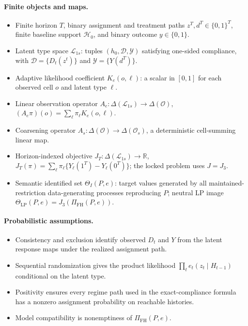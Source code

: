 \documentclass[11pt]{article}
\theoremstyle{definition}
\theoremstyle{plain}
\theoremstyle{remark}
\begin{document}
\paragraph{Finite objects and maps.}
\begin{itemize}[leftmargin=*]
\item Finite horizon \(T\), binary assignment and treatment paths \(z^T,d^T\in\{0,1\}^T\), finite baseline support \(\mathcal H_0\), and binary outcome \(y\in\{0,1\}\).
\item Latent type space \(\mathcal L_{1s}\): tuples \((h_0,\mathcal D,\mathcal Y)\) satisfying one-sided compliance, with \(\mathcal D=\{D_t(z^t)\}\) and \(\mathcal Y=\{Y(d^T)\}\).
\item Adaptive likelihood coefficient \(K_e(o,\ell)\): a scalar in \([0,1]\) for each observed cell \(o\) and latent type \(\ell\).
\item Linear observation operator \(A_e:\Delta(\mathcal L_{1s})\to\Delta(\mathcal O)\), \((A_e\pi)(o)=\sum_\ell\pi_\ell K_e(o,\ell)\).
\item Coarsening operator \(A_s:\Delta(\mathcal O)\to\Delta(\mathcal O_s)\), a deterministic cell-summing linear map.
\item Horizon-indexed objective \(J_T:\Delta(\mathcal L_{1s})\to\mathbb R\), \(J_T(\pi)=\sum_\ell\pi_\ell\{Y_\ell(1^T)-Y_\ell(0^T)\}\); the locked problem uses \(J=J_3\).
\item Semantic identified set \(\Theta_I(P,e)\): target values generated by all maintained-restriction data-generating processes reproducing \(P\); neutral LP image \(\Theta_{\mathrm{LP}}(P,e)=J_3(\Pi_{\mathrm{FH}}(P,e))\).
\end{itemize}

\paragraph{Probabilistic assumptions.}
\begin{itemize}[leftmargin=*]
\item Consistency and exclusion identify observed \(D_t\) and \(Y\) from the latent response maps under the realized assignment path.
\item Sequential randomization gives the product likelihood \(\prod_t e_t(z_t\mid H_{t-1})\) conditional on the latent type.
\item Positivity ensures every regime path used in the exact-compliance formula has a nonzero assignment probability on reachable histories.
\item Model compatibility is nonemptiness of \(\Pi_{\mathrm{FH}}(P,e)\).
\end{itemize}
\end{document}
